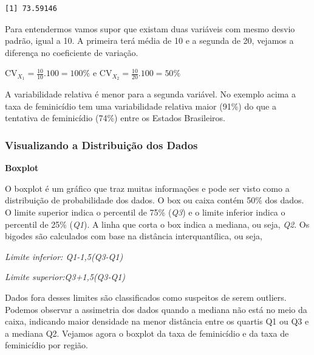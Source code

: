 \documentclass[
  letterpaper,
  DIV=11,
  numbers=noendperiod]{scrreprt}
\newenvironment{Shaded}{\begin{snugshade}}{\end{snugshade}}
\newcommand{\AttributeTok}[1]{\textcolor[rgb]{0.40,0.45,0.13}{#1}}
\newcommand{\ConstantTok}[1]{\textcolor[rgb]{0.56,0.35,0.01}{#1}}
\newcommand{\DecValTok}[1]{\textcolor[rgb]{0.68,0.00,0.00}{#1}}
\newcommand{\FunctionTok}[1]{\textcolor[rgb]{0.28,0.35,0.67}{#1}}
\newcommand{\NormalTok}[1]{\textcolor[rgb]{0.00,0.23,0.31}{#1}}
\newcommand{\SpecialCharTok}[1]{\textcolor[rgb]{0.37,0.37,0.37}{#1}}
\begin{document}
\begin{Shaded}
\end{Shaded}

\begin{verbatim}
[1] 73.59146
\end{verbatim}

Para entendermos vamos supor que existam duas variáveis com mesmo desvio
padrão, igual a 10. A primeira terá média de 10 e a segunda de 20,
vejamos a diferença no coeficiente de variação.

\(\text{CV}_{X_1}=\frac{10}{10}.100=100\%\) e
\(\text{CV}_{X_2}=\frac{10}{20}.100=50\%\)

A variabilidade relativa é menor para a segunda variável. No exemplo
acima a taxa de feminicídio tem uma variabilidade relativa maior (91\%)
do que a tentativa de feminicídio (74\%) entre os Estados Brasileiros.

\subsubsection{Visualizando a Distribuição dos
Dados}\label{visualizando-a-distribuiuxe7uxe3o-dos-dados}

\textbf{Boxplot}

O boxplot é um gráfico que traz muitas informações e pode ser visto como
a distribuição de probabilidade dos dados. O box ou caixa contém 50\%
dos dados. O limite superior indica o percentil de 75\% (\emph{Q3}) e o
limite inferior indica o percentil de 25\% (\emph{Q1}). A linha que
corta o box indica a mediana, ou seja, \emph{Q2}. Os bigodes são
calculados com base na distância interquantílica, ou seja,

\emph{Limite inferior: Q1-1,5(Q3-Q1)}

\emph{Limite superior:Q3+1,5(Q3-Q1)}

Dados fora desses limites são classificados como suspeitos de serem
outliers. Podemos observar a assimetria dos dados quando a mediana não
está no meio da caixa, indicando maior densidade na menor distância
entre os quartis Q1 ou Q3 e a mediana Q2. Vejamos agora o boxplot da
taxa de feminicídio e da taxa de feminicídio por região.
\end{document}
